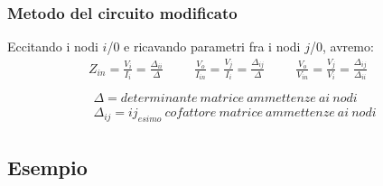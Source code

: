 \begin{frame}
 \frametitle{Metodo del circuito modificato}

 Eccitando i nodi $i$/$0$ e ricavando parametri fra i nodi $j$/$0$, avremo:
  $$
   \begin{array}{c}
    Z_{in} = \frac{V_i}{I_i} = \frac{\Delta_{ii}}{\Delta}~\qquad~
    \frac{V_o}{I_{in}} = \frac{V_j}{I_i} = \frac{\Delta_{ij}}{\Delta}~\qquad~
    \frac{V_o}{V_{in}} = \frac{V_j}{V_i} = \frac{\Delta_{ij}}{\Delta_{ii}}
    \\ \\
    \begin{array}{c}
      \Delta = determinante~matrice~ammettenze~ai~nodi\\
      \Delta_{ij} = ij_{esimo}~cofattore~matrice~ammettenze~ai~nodi
    \end{array}
   \end{array}
  $$

 \begin{center}
  \begin{overprint}
  \end{overprint}
 \end{center}


\end{frame}


\subsection{Esempio}


